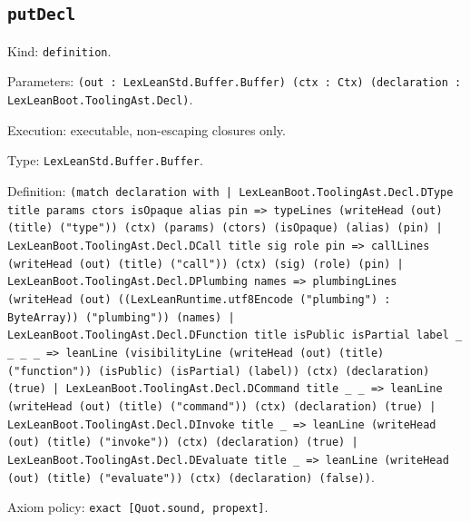 \documentclass[11pt]{article}
\begin{document}
\subsection*{\texttt{putDecl}}
\noindent Kind: \texttt{definition}.\par
\noindent Parameters: \texttt{(out : LexLeanStd.Buffer.Buffer) (ctx : Ctx) (declaration : LexLeanBoot.ToolingAst.Decl)}.\par
\noindent Execution: executable, non-escaping closures only.\par
\noindent Type: \texttt{LexLeanStd.Buffer.Buffer}.\par
\noindent Definition: \texttt{(match declaration with | LexLeanBoot.ToolingAst.Decl.DType title params ctors isOpaque alias pin => typeLines (writeHead (out) (title) ("type")) (ctx) (params) (ctors) (isOpaque) (alias) (pin) | LexLeanBoot.ToolingAst.Decl.DCall title sig role pin => callLines (writeHead (out) (title) ("call")) (ctx) (sig) (role) (pin) | LexLeanBoot.ToolingAst.Decl.DPlumbing names => plumbingLines (writeHead (out) ((LexLeanRuntime.utf8Encode ("plumbing") : ByteArray)) ("plumbing")) (names) | LexLeanBoot.ToolingAst.Decl.DFunction title isPublic isPartial label \_ \_ \_ \_ => leanLine (visibilityLine (writeHead (out) (title) ("function")) (isPublic) (isPartial) (label)) (ctx) (declaration) (true) | LexLeanBoot.ToolingAst.Decl.DCommand title \_ \_ => leanLine (writeHead (out) (title) ("command")) (ctx) (declaration) (true) | LexLeanBoot.ToolingAst.Decl.DInvoke title \_ => leanLine (writeHead (out) (title) ("invoke")) (ctx) (declaration) (true) | LexLeanBoot.ToolingAst.Decl.DEvaluate title \_ => leanLine (writeHead (out) (title) ("evaluate")) (ctx) (declaration) (false))}.\par
\noindent Axiom policy: \texttt{exact [Quot.sound, propext]}.\par
\end{document}
